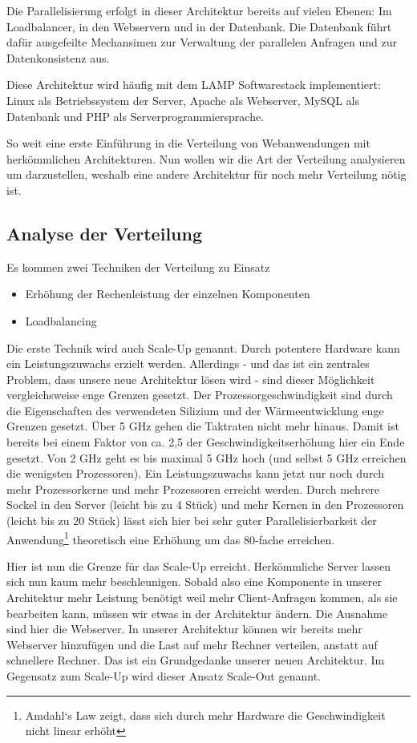 \begin{itemize}
Die Parallelisierung erfolgt in dieser Architektur bereits auf vielen Ebenen: Im Loadbalancer, in den Webservern und in der
Datenbank. Die Datenbank führt dafür ausgefeilte Mechansimen zur Verwaltung der parallelen Anfragen und zur
Datenkonsistenz aus.

Diese Architektur wird häufig mit dem LAMP Softwarestack implementiert: Linux als Betriebssystem der Server,
Apache als Webserver, MySQL als Datenbank und PHP als Serverprogrammiersprache.

So weit eine erste Einführung in die Verteilung von Webanwendungen mit herkömmlichen Architekturen.
Nun wollen wir die Art der Verteilung analysieren um darzustellen, weshalb eine andere Architektur für noch
mehr Verteilung nötig ist.

\subsection{Analyse der Verteilung}
Es kommen zwei Techniken der Verteilung zu Einsatz
\begin{itemize}
  \item Erhöhung der Rechenleistung der einzelnen Komponenten
  \item Loadbalancing
\end{itemize}

Die erste Technik wird auch Scale-Up genannt. Durch potentere Hardware kann ein Leistungszuwachs erzielt werden.
Allerdings - und das ist ein zentrales Problem, dass unsere neue Architektur lösen wird - sind dieser Möglichkeit
vergleichsweise enge Grenzen gesetzt. Der Prozessorgeschwindigkeit sind durch die Eigenschaften des verwendeten
Silizium und der Wärmeentwicklung enge Grenzen gesetzt. Über 5 GHz gehen die Taktraten nicht mehr hinaus.
Damit ist bereits bei einem Faktor von ca. 2,5 der Geschwindigkeitserhöhung hier ein Ende gesetzt. Von 2 GHz
geht es bis maximal 5 GHz hoch (und selbst 5 GHz erreichen die wenigsten Prozessoren). Ein Leistungszuwachs
kann jetzt nur noch durch mehr Prozessorkerne und mehr Prozessoren erreicht werden. Durch mehrere Sockel
in den Server (leicht bis zu 4 Stück) und mehr Kernen in den Prozessoren (leicht bis zu 20 Stück) lässt sich hier
bei sehr guter Parallelisierbarkeit der Anwendung\footnote{Amdahl‘s Law zeigt, dass sich durch mehr
Hardware die Geschwindigkeit nicht linear erhöht} theoretisch eine Erhöhung um das 80-fache erreichen.

Hier ist nun die Grenze für das Scale-Up erreicht. Herkömmliche Server lassen sich nun kaum mehr beschleunigen.
Sobald also eine Komponente in unserer Architektur mehr Leistung benötigt weil mehr Client-Anfragen kommen,
als sie bearbeiten kann, müssen wir etwas in der Architektur ändern. Die Ausnahme sind hier die Webserver.
In unserer Architektur können wir bereits mehr Webserver hinzufügen und die Last auf mehr Rechner verteilen,
anstatt auf schnellere Rechner. Das ist ein Grundgedanke unserer neuen Architektur. Im Gegensatz zum Scale-Up
wird dieser Ansatz Scale-Out genannt.


\end{itemize}
